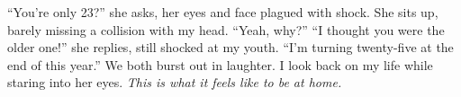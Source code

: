 \documentclass[a4paper, 12pt]{book}
\newcommand\tab[1][1cm]{\hspace*{#1}}
\begin{document}
\newline
\tab
“You’re only 23?” she asks, her eyes and face plagued with shock. She sits up, barely missing a collision with my head.
\newline
\tab
“Yeah, why?”
\newline
\tab
“I thought you were the older one!” she replies, still shocked at my youth. “I’m turning twenty-five at the end of this year.” We both burst out in laughter. I look back on my life while staring into her eyes. \textit{This is what it feels like to be at home.}
\end{document}
